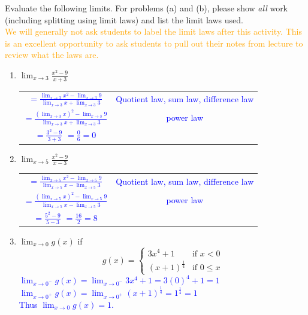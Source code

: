 \documentclass{ximera}
\begin{document}
\begin{exercise}
    Evaluate the following limits.  For problems (a) and (b), please show \textit{all} work (including splitting using limit laws) and list the limit laws used.\\
    \textcolor{orange}{We will generally not ask students to label the limit laws after this activity.  This is an excellent opportunity to ask students to pull out their notes from lecture to review what the laws are. }
  \begin{enumerate}
 

   \item $\displaystyle \lim_{x\rightarrow 3} \frac{x^2-9}{x+3}$\\ 
     \textcolor{blue}{\begin{tabular}{c|c}
       $\displaystyle=\frac{\lim_{x\rightarrow 3} x^2-\lim_{x\rightarrow 3}9}{\lim_{x\rightarrow3}x+\lim_{x\rightarrow 3}3}$  & Quotient law, sum law, difference law  \\
        $=\displaystyle \frac{(\lim_{x\rightarrow 3} x)^2-\lim_{x\rightarrow 3}9}{\lim_{x\rightarrow3}x+\lim_{x\rightarrow 3}3}$ & power law\\
        $=\frac{3^2-9}{3+3}$
        $=\frac{0}{6}=0$ & 
    \end{tabular}}
    \item $\displaystyle \lim_{x\rightarrow 5} \frac{x^2-9}{x-3}$ \\
    \textcolor{blue}{\begin{tabular}{c|c}
       $\displaystyle=\frac{\lim_{x\rightarrow 5} x^2-\lim_{x\rightarrow 5}9}{\lim_{x\rightarrow 5}x-\lim_{x\rightarrow 5}3}$  & Quotient law, sum law, difference law  \\
        $=\displaystyle \frac{(\lim_{x\rightarrow 5} x)^2-\lim_{x\rightarrow 5}9}{\lim_{x\rightarrow5}x-\lim_{x\rightarrow 5}3}$ & power law\\
        $=\frac{5^2-9}{5-3}$
        $=\frac{16}{2}=8$ & 
        \end{tabular}}
    \item $\displaystyle \lim_{x\rightarrow 0}g(x)$ if \[g(x)= 
    \begin{cases}
    3x^4+1 &\text{if }x<0\\
    (x+1)^{\frac14} &\text{if }0\leq x
    \end{cases}\]
    \textcolor{blue}{ $\displaystyle \lim_{x\rightarrow 0^-}g(x)=\lim_{x\rightarrow 0^-} 3x^4+1=3(0)^4+1=1$\\
    $\displaystyle \lim_{x\rightarrow 0^+}g(x)=\lim_{x\rightarrow 0^+}(x+1)^{\frac14}=1^{\frac14}=1$\\
    Thus $\displaystyle \lim_{x\rightarrow 0} g(x)=1$.}
  \end{enumerate}
\end{exercise}
\end{document}
